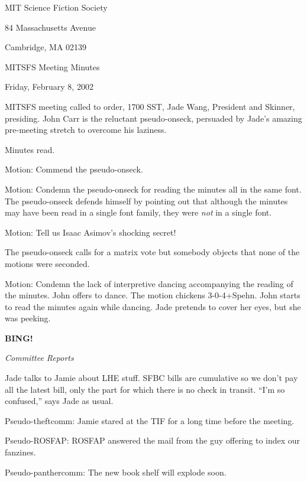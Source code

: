 \documentclass[12pt]{article}
\newcommand{\bing}{{\bf BING!} }
\newcommand{\goto}[1]{\bing \vskip 12pt \centerline{{\em{#1}}}}
\begin{document}
\begin{center}

MIT Science Fiction Society 

84 Massachusetts Avenue

Cambridge, MA 02139

\vspace{12pt}

MITSFS Meeting Minutes 

Friday, February 8, 2002

\end{center}
 
\vspace{18pt}

\setlength{\parskip}{6pt}

\noindent
MITSFS meeting called to order, 1700 SST, Jade Wang, President and Skinner,
presiding.
John Carr is the reluctant pseudo-onseck, persuaded by Jade's amazing
pre-meeting stretch to overcome his laziness.

Minutes read.

Motion: Commend the pseudo-onseck.

Motion: Condemn the pseudo-onseck for reading the minutes all in
the same font.  The pseudo-onseck defends himself by pointing out
that although the minutes may have been read in a single font
family, they were {\em not} in a single font.

Motion: Tell us Isaac Asimov's shocking secret!

The pseudo-onseck calls for a matrix vote but somebody objects that
none of the motions were seconded.

Motion: Condemn the lack of interpretive dancing accompanying the
reading of the minutes.  John offers to dance.  The motion chickens
\hbox{3-0-4+Spehn}.  John starts to read the minutes again while
dancing.  Jade pretends to cover her eyes, but she was peeking.

\goto{Committee Reports}

Jade talks to Jamie about LHE stuff.  SFBC bills are cumulative so
we don't pay all the latest bill, only the part for which there is
no check in transit.  ``I'm so confused,'' says Jade as usual.

Pseudo-theftcomm: Jamie stared at the TIF for a long time before
the meeting.

Pseudo-ROSFAP: ROSFAP answered the mail from the guy offering to index
our fanzines.

Pseudo-panthercomm: The new book shelf will explode soon.
\end{document}
